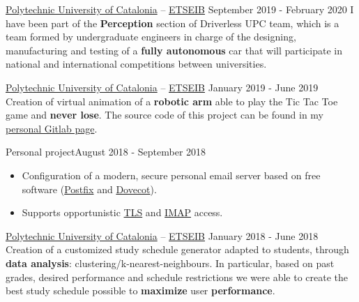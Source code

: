 \documentclass[10pt, a4paper, ragged2e]{../altacv}
\begin{document}
{\href{https://www.upc.edu/en}{Polytechnic University of Catalonia} --
\href{https://etseib.upc.edu/en}{ETSEIB}}
{September 2019 - February 2020}{}
I have been part of the \textbf{Perception} section of Driverless UPC team,
which is a team formed by undergraduate engineers in charge of the designing,
manufacturing and testing of a \textbf{fully autonomous} car that will
participate in national and international competitions between universities.

\divider

{\href{https://www.upc.edu/en}{Polytechnic University of Catalonia} --
\href{https://etseib.upc.edu/en}{ETSEIB}}
{January 2019 - June 2019}{}
Creation of virtual animation of a \textbf{robotic arm} able to play the Tic
Tac Toe game and \textbf{never lose}. The source code of this project can be
found in my \href{https://gitlab.com/david-alvarez-rosa/}{personal Gitlab
  page\footnotemark}.

\divider

{Personal project}{August 2018 - September 2018}{}
\begin{itemize}
  \item Configuration of a modern, secure personal email server based on
  free software (\href{http://www.postfix.org/}{Postfix} and
  \href{https://www.dovecot.org/}{Dovecot}).
  \item Supports opportunistic
  \href{https://en.wikipedia.org/wiki/Transport_Layer_Security}{TLS} and
  \href{https://en.wikipedia.org/wiki/Internet_Message_Access_Protocol}
  {IMAP} access.
\end{itemize}

\divider

{\href{https://www.upc.edu/en}{Polytechnic University of Catalonia} --
\href{https://etseib.upc.edu/en}{ETSEIB}}
{January 2018 - June 2018}{}
Creation of a customized study schedule generator adapted to students, through
\textbf{data analysis}: clustering/k-nearest-neighbours. In particular, based on
past grades, desired performance and schedule restrictions we were able to
create the best study schedule possible to \textbf{maximize} user
\textbf{performance}.

\medskip


\end{document}
